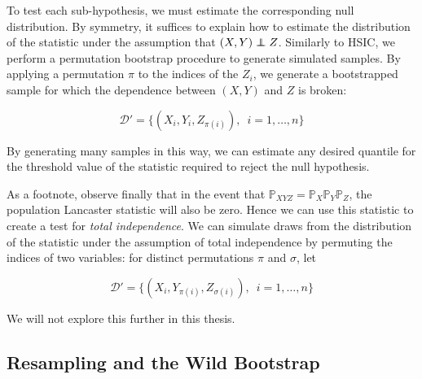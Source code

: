 \documentclass[12pt]{article}
\newcommand\independent{\protect\mathpalette{\protect\independenT}{\perp}}
\def\independenT#1#2{\mathrel{\rlap{$#1#2$}\mkern2mu{#1#2}}}
\numberwithin{claim}{section}
\numberwithin{lemma}{section}
\numberwithin{theorem}{section}
\begin{document}
To test each sub-hypothesis, we must estimate the corresponding null distribution. By symmetry, it suffices to explain how to estimate the distribution of the statistic under the assumption that $(X,Y)\independent Z$. Similarly to HSIC, we perform a permutation bootstrap procedure to generate simulated samples.  By applying a permutation $\pi$ to the indices of the $Z_i$, we generate a bootstrapped sample for which the dependence between $(X,Y)$ and $Z$ is broken:

\[ \mathcal{D}' = \{ (X_i, Y_i, Z_{\pi(i)}), \enspace i=1,\ldots, n\} \]

By generating many samples in this way, we can estimate any desired quantile for the threshold value of the statistic required to reject the null hypothesis.

As a footnote, observe finally that in the event that $\mathbb{P}_{XYZ} = \mathbb{P}_X\mathbb{P}_Y\mathbb{P}_Z$, the population Lancaster statistic will also be zero. Hence we can use this statistic to create a test for \emph{total independence}. We can simulate draws from the distribution of the statistic under the assumption of total independence by permuting the indices of two variables: for distinct permutations $\pi$ and $\sigma$, let

\[ \mathcal{D}' = \{ (X_i, Y_{\pi(i)}, Z_{\sigma(i)}), \enspace i=1,\ldots, n\} \]

We will not explore this further in this thesis.

\subsection{Resampling and the Wild Bootstrap}
\end{document}
